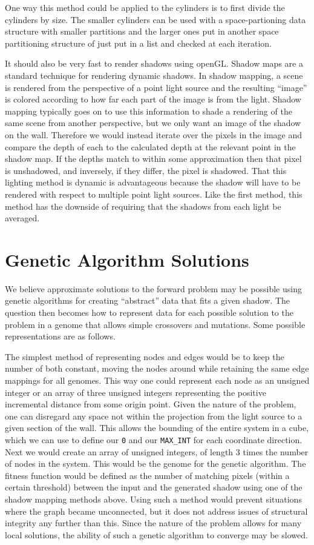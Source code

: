 \documentclass[10pt]{article}
\begin{document}
One way this method could be applied to the cylinders is to first divide the cylinders by size. The smaller cylinders can be used with a space-partioning data structure with smaller partitions and the larger ones put in another space partitioning structure of just put in a list and checked at each iteration.

It should also be very fast to render shadows using openGL. Shadow maps are a standard technique for rendering dynamic shadows. In shadow mapping, a scene is rendered from the perspective of a point light source and the resulting ``image'' is colored according to how far each part of the image is from the light. Shadow mapping typically goes on to use this information to shade a rendering of the same scene from another perspective, but we only want an image of the shadow on the wall. Therefore we would instead iterate over the pixels in the image and compare the depth of each to the calculated depth at the relevant point in the shadow map. If the depths match to within some approximation then that pixel is unshadowed, and inversely, if they differ, the pixel is shadowed. That this lighting method is dynamic is advantageous because the shadow will have to be rendered with respect to multiple point light sources. Like the first method, this method has the downside of requiring that the shadows from each light be averaged.

\section{Genetic Algorithm Solutions} \label{GA}
We believe approximate solutions to the forward problem may be possible using genetic algorithms for creating ``abstract'' data that fits a given shadow.  The question then becomes how to represent data for each possible solution to the problem in a genome that allows simple crossovers and mutations.  Some possible representations are as follows.

The simplest method of representing nodes and edges would be to keep the number of both constant, moving the nodes around while retaining the same edge mappings for all genomes.  This way one could represent each node as an unsigned integer or an array of three unsigned integers representing the positive incremental distance from some origin point.  Given the nature of the problem, one can disregard any space not within the projection from the light source to a given section of the wall.  This allows the bounding of the entire system in a cube, which we can use to define our \texttt{0} and our \texttt{MAX\_INT} for each coordinate direction.  Next we would create an array of unsigned integers, of length 3 times the number of nodes in the system.  This would be the genome for the genetic algorithm.  The fitness function would be defined as the number of matching pixels (within a certain threshold) between the input and the generated shadow using one of the shadow mapping methods above.  Using such a method would prevent situations where the graph became unconnected, but it does not address issues of structural integrity any further than this.  Since the nature of the problem allows for many local solutions, the ability of such a genetic algorithm to converge may be slowed.
\end{document}
